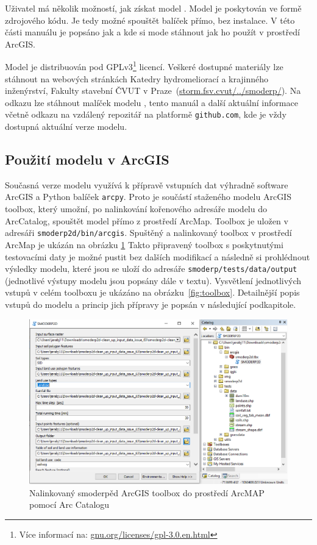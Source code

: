 Uživatel má několik možností, jak získat model \smod. 
Model \smod je poskytován ve formě zdrojového kódu. Je tedy možné spouštět 
balíček přímo, bez instalace. V této části manuálu je popsáno jak a kde si mode  \smod 
stáhnout  jak ho použít v prostředí ArcGIS.
  
Model \smod je distribuován pod GPLv3\footnote{Více informací na: 
\href{https://www.gnu.org/licenses/gpl-3.0.en.html}{gnu.org/licenses/gpl-3.0.en.html}} licencí. 
Veškeré dostupné  materiály lze stáhnout na webových stránkách Katedry hydromeliorací 
a krajinného inženýrství, Fakulty stavební ČVUT 
v Praze~(\href{http://storm.fsv.cvut.cz/cinnost-katedry/volne-stazitelne-vysledky/smoderp/}{storm.fsv.cvut/../smoderp/}). 
Na odkazu lze stáhnout malíček modelu \smod, tento manuál a další aktuální informace včetně odkazu na vzdálený 
repozitář na platformě {\tt github.com}, kde je vždy dostupná aktuální verze modelu. 


\subsection{Použití modelu v ArcGIS}
  
Současná verze modelu \smod využívá k přípravě vstupních dat výhradně software ArcGIS a Python balíček {\tt arcpy}. 
Proto je součástí staženého modelu ArcGIS toolbox, který umožní, po nalinkování kořenového adresáře modelu do ArcCatalog, 
spouštět model \smod přímo z prostředí ArcMap. Toolbox je uložen v adresáři {\tt smoderp2d/bin/arcgis}.
Spuštěný a nalinkovaný toolbox v prostředí ArcMap je ukázán na obrázku \ref{fig:toolboxlink}
Takto připravený toolbox s poskytnutými testovacími daty je možné pustit bez dalších modifikací a následně si prohlédnout 
výsledky modelu, které jsou se uloží do adresáře {\tt smoderp/tests/data/output} 
(jednotlivé výstupy modelu jsou popsány dále v textu). 
Vysvětlení jednotlivých vstupů v celém toolboxu je ukázáno na obrázku~\ref{fig:toolbox}. Detailnější popis vstupů 
do modelu a princip jich přípravy je popsán v následující podkapitole. 


 \begin{figure}[t!]
    \centering
    \includegraphics[width=1.0\textwidth]{./img/arcmap01.png}
     \caption{Nalinkovaný smoderpěd ArcGIS toolbox do prostředí ArcMAP pomocí Arc Catalogu}
    \label{fig:toolboxlink}
  \end{figure}


